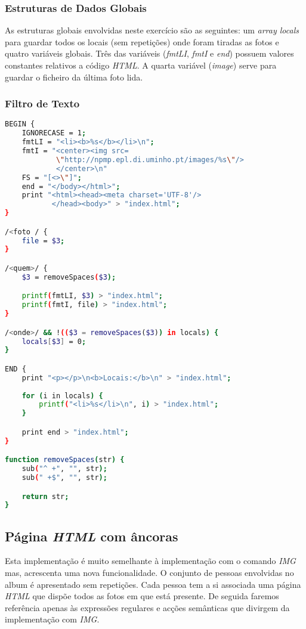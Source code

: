 \documentclass{article}
\begin{document}
\subsubsection{Estruturas de Dados Globais}

As estruturas globais envolvidas neste exercício são as seguintes: um \emph{array locals} para guardar todos os locais (sem repetições) onde foram tiradas as fotos e quatro variáveis globais. Três das variáveis (\emph{fmtLI}, \emph{fmtI} e \emph{end}) possuem valores constantes relativos a código \emph{HTML}. A quarta variável (\emph{image}) serve para guardar o ficheiro da última foto lida.


\subsubsection{Filtro de Texto}

\begin{lstlisting}[language=bash]
BEGIN {
	IGNORECASE = 1;
	fmtLI = "<li><b>%s</b></li>\n";
	fmtI = "<center><img src=
	        \"http://npmp.epl.di.uminho.pt/images/%s\"/> 
	        </center>\n"
	FS = "[<>\"]";
	end = "</body></html>";
	print "<html><head><meta charset='UTF-8'/>
	       </head><body>" > "index.html";
}

/<foto / {
	file = $3;
}

/<quem>/ {
	$3 = removeSpaces($3);

	printf(fmtLI, $3) > "index.html";
	printf(fmtI, file) > "index.html";
}

/<onde>/ && !(($3 = removeSpaces($3)) in locals) {
	locals[$3] = 0;
}

END {
	print "<p></p>\n<b>Locais:</b>\n" > "index.html";
	
	for (i in locals) {
		printf("<li>%s</li>\n", i) > "index.html";
	}

	print end > "index.html";
}

function removeSpaces(str) {
	sub("^ +", "", str);
	sub(" +$", "", str);

	return str;
}

\end{lstlisting}



\subsection{Página \emph{HTML} com âncoras}
Esta implementação é muito semelhante à implementação com o comando \emph{IMG} mas, acrescenta uma nova funcionalidade. O conjunto de pessoas envolvidas no album é apresentado sem repetições. Cada pessoa tem a si associada uma página \emph{HTML} que dispõe todos as fotos em que está presente. De seguida faremos referência apenas às expressões regulares e acções semânticas que divirgem da implementação com \emph{IMG}.
\end{document}
